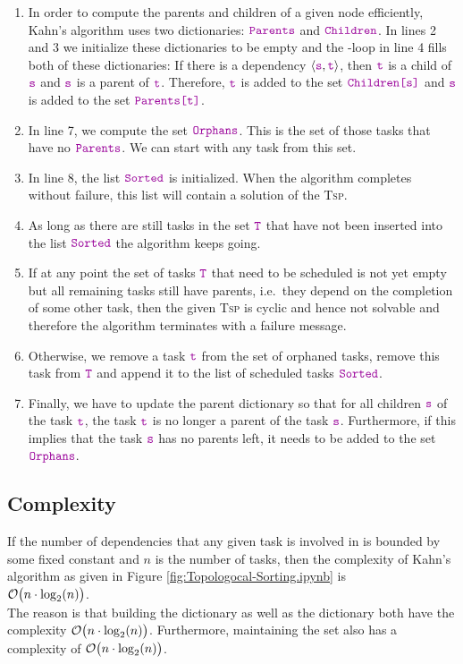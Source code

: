 \begin{enumerate}
\item In order to compute the parents and children of a given node efficiently, Kahn's algorithm
      uses two dictionaries: $\mytt{Parents}$ and $\mytt{Children}$.
      In lines 2 and 3 we initialize these dictionaries to be empty and the -loop in line 4 fills both of these
      dictionaries: If there is a dependency $\pair(\mytt{s}, \mytt{t})$, then $\mytt{t}$ is a child of
      $\mytt{s}$ and $\mytt{s}$ is a parent of $\mytt{t}$.  Therefore, $\mytt{t}$ is added to the set
      $\mytt{Children[s]}$ and $\mytt{s}$ is added to the set $\mytt{Parents[t]}$.
\item In line 7, we compute the set $\mytt{Orphans}$.  This is the set of those tasks that have no
      $\mytt{Parents}$.  We can start with any task from this set.
\item In line 8, the list $\mytt{Sorted}$ is initialized.  When the algorithm completes without failure, this list will
      contain a solution of the \textsc{Tsp}.
\item As long as there are still tasks in the set $\mytt{T}$ that have not been inserted into the list
      $\mytt{Sorted}$ the algorithm keeps going.
\item If at any point the set of tasks $\mytt{T}$ that need to be scheduled is not yet empty but all remaining
      tasks still have parents, i.e.~they depend on the completion of some other task, then the given \textsc{Tsp}
      is cyclic and hence not solvable and therefore the algorithm terminates with a failure message.
\item Otherwise, we remove a task $\mytt{t}$ from the set of orphaned tasks, remove this task from $\mytt{T}$
      and append it to the list of scheduled tasks $\mytt{Sorted}$.
\item Finally, we have to update the parent dictionary so that for all children $\mytt{s}$ of the task
      $\mytt{t}$, the task $\mytt{t}$ is no longer a parent of the task $\mytt{s}$.  Furthermore, if this
      implies that the task $\mytt{s}$ has no parents left, it needs to be added to the set $\mytt{Orphans}$.
\end{enumerate}

\subsection{Complexity}
If the number of dependencies that any given task is involved in is bounded by some fixed constant and $n$ is
the number of tasks,  then the complexity of Kahn's algorithm as given in Figure \ref{fig:Topologocal-Sorting.ipynb}
is  
\\[0.2cm]
\hspace*{1.3cm}
$\mathcal{O}\bigl(n \cdot \log_2(n)\bigr)$.
\\[0.2cm]
The reason is that building the dictionary  as well as the dictionary  both
have the complexity $\mathcal{O}\bigl(n \cdot \log_2(n)\bigr)$. Furthermore, maintaining  the set  also
has a complexity of
$\mathcal{O}\bigl(n \cdot \log_2(n)\bigr)$.

